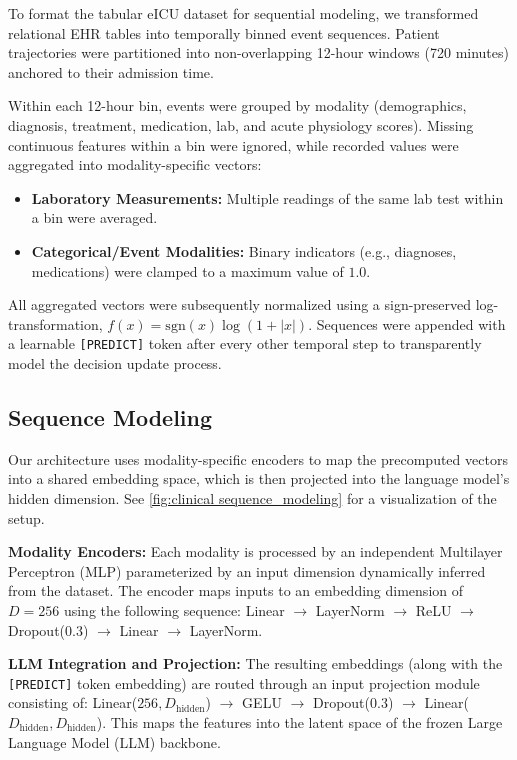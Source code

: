 \documentclass{article}
\begin{document}
To format the tabular eICU dataset for sequential modeling, we transformed relational EHR tables into temporally binned event sequences. Patient trajectories were partitioned into non-overlapping 12-hour windows (720 minutes) anchored to their admission time. 

Within each 12-hour bin, events were grouped by modality (demographics, diagnosis, treatment, medication, lab, and acute physiology scores). Missing continuous features within a bin were ignored, while recorded values were aggregated into modality-specific vectors:
\begin{itemize}
    \item \textbf{Laboratory Measurements:} Multiple readings of the same lab test within a bin were averaged.
    \item \textbf{Categorical/Event Modalities:} Binary indicators (e.g., diagnoses, medications) were clamped to a maximum value of $1.0$.
\end{itemize}
All aggregated vectors were subsequently normalized using a sign-preserved log-transformation, $f(x) = \text{sgn}(x) \log(1 + |x|)$. Sequences were appended with a learnable \texttt{[PREDICT]} token after every other temporal step to transparently model the decision update process. 



\subsection{Sequence Modeling}
Our architecture uses modality-specific encoders to map the precomputed vectors into a shared embedding space, which is then projected into the language model's hidden dimension. See \ref{fig:clinical sequence_modeling} for a visualization of the setup.

\textbf{Modality Encoders:} Each modality is processed by an independent Multilayer Perceptron (MLP) parameterized by an input dimension dynamically inferred from the dataset. The encoder maps inputs to an embedding dimension of $D=256$ using the following sequence: Linear $\to$ LayerNorm $\to$ ReLU $\to$ Dropout($0.3$) $\to$ Linear $\to$ LayerNorm. 

\textbf{LLM Integration and Projection:} The resulting embeddings (along with the \texttt{[PREDICT]} token embedding) are routed through an input projection module consisting of: Linear($256, D_{\text{hidden}}$) $\to$ GELU $\to$ Dropout($0.3$) $\to$ Linear($D_{\text{hidden}}, D_{\text{hidden}}$). This maps the features into the latent space of the frozen Large Language Model (LLM) backbone. 
\end{document}
